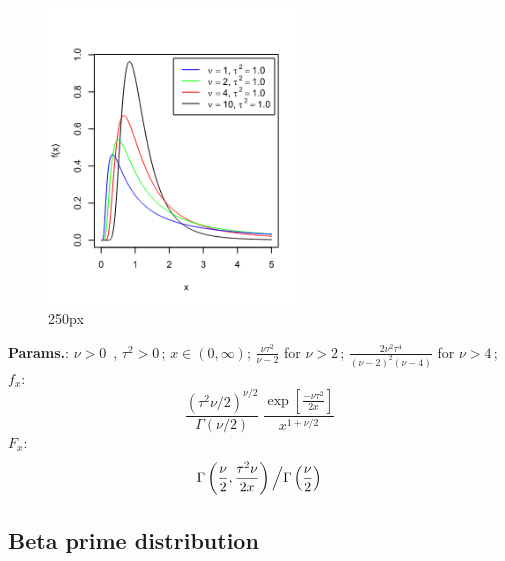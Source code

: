     \begin{figure}[H]
        \centering
        \includegraphics[width=0.6\textwidth]{images/Scaled inverse chi squared.png}
        \caption{250px}
    \end{figure}




    {\color{darkblue} \textbf{Params.}:} {$\nu > 0\,$ ,  $\tau^2 > 0\,$}; {$x \in (0, \infty)$}; {$\frac{\nu \tau^2}{\nu-2}$ for $\nu >2\,$}; {$\frac{2 \nu^2 \tau^4}{(\nu-2)^2 (\nu-4)}$ for $\nu >4\,$};\hspace{0.5cm}\\{\color{darkblue} \textbf{$f_x$}:} {$$\frac{(\tau^2\nu/2)^{\nu/2}}{\Gamma(\nu/2)}~
\frac{\exp\left[ \frac{-\nu \tau^2}{2 x}\right]}{x^{1+\nu/2}}$$}{\color{darkblue} \textbf{$F_x$}:} {$$\Gamma\left(\frac{\nu}{2},\frac{\tau^2\nu}{2x}\right)
\left/\Gamma\left(\frac{\nu}{2}\right)\right.$$}



    
        
\subsection{Beta prime distribution}


